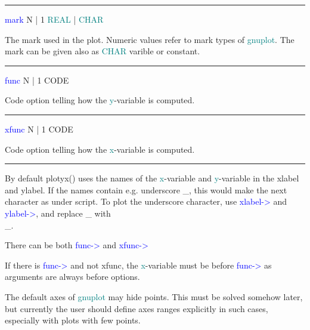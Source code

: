 \vspace{0.3cm} 
\hrule 
\vspace{0.3cm} 
\noindent \textcolor{blue}{mark}  \tabto{3cm}  N | 1  \tabto{5cm}   \textcolor{teal}{REAL} | \textcolor{teal}{CHAR}  \tabto{7cm} 
\begin{changemargin}{3cm}{0cm} 
\noindent  The mark used in the plot. Numeric values refer to 
mark types of \textcolor{teal}{gnuplot}. The mark can be given also as \textcolor{teal}{CHAR} varible or constant. 
\end{changemargin} 
\vspace{0.3cm} 
\hrule 
\vspace{0.3cm} 
\noindent \textcolor{blue}{func} \tabto{3cm}  N | 1  \tabto{5cm}   CODE  \tabto{7cm} 
\begin{changemargin}{3cm}{0cm} 
\noindent   Code option telling how the \textcolor{teal}{y}-variable is computed. 
\end{changemargin} 
\vspace{0.3cm} 
\hrule 
\vspace{0.3cm} 
\noindent \textcolor{blue}{xfunc} \tabto{3cm}  N | 1  \tabto{5cm}   CODE  \tabto{7cm} 
\begin{changemargin}{3cm}{0cm} 
\noindent   Code option telling how the \textcolor{teal}{x}-variable is computed. 
\end {changemargin} 
\hrule 
\vspace{0.2cm} 
\begin{note} 
By default \textcolor{VioletRed}{plotyx}() uses the names of the \textcolor{teal}{x}-variable and \textcolor{teal}{y}-variable 
in the xlabel and ylabel. If the names contain e.g. underscore \_, this would make 
the next character as under script. To plot the underscore character, 
use \textcolor{blue}{xlabel->} 	and \textcolor{blue}{ylabel->}, and replace \_ with \\\_. 
\end{note} 
\begin{note} 
There can be both \textcolor{blue}{func->} and \textcolor{blue}{xfunc->} 
\end{note} 
\begin{note} 
If there is \textcolor{blue}{func->} and not xfunc, the \textcolor{teal}{x}-variable must be before \textcolor{blue}{func->} 
as arguments are always before options. 
\end{note} 
\begin{note} 
The default axes of \textcolor{teal}{gnuplot} may hide points. This must be solved somehow later, 
but currently the user should define axes ranges explicitly in such cases, especially with plots with few 
points. 
\end{note} 
